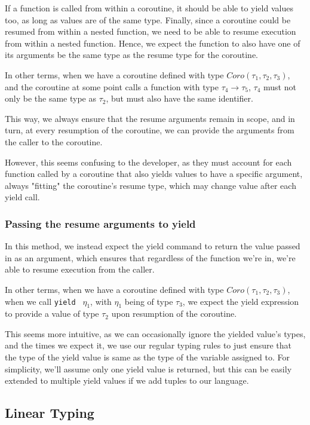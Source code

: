 \documentclass[review,twocolumn]{sigplanconf}
\begin{document}
If a function is called from within a coroutine, it should be able to yield values too, as long as values are of the same type. Finally, since a coroutine could be resumed from within a nested function, we need to be able to resume execution from within a nested function. Hence, we expect the function to also have one of its arguments be the same type as the resume type for the coroutine.

In other terms, when we have a coroutine defined with type $Coro(\tau_1, \tau_2, \tau_3)$, and the coroutine at some point calls a function with type $\tau_4 \rightarrow \tau_5$, $\tau_4$ must not only be the same type as $\tau_2$, but must also have the same identifier.

This way, we always ensure that the resume arguments remain in scope, and in turn, at every resumption of the coroutine, we can provide the arguments from the caller to the coroutine.

However, this seems confusing to the developer, as they must account for each function called by a coroutine that also yields values to have a specific argument, always "fitting" the coroutine's resume type, which may change  value after each yield call.

\subsubsection{Passing the resume arguments to yield}

In this method, we instead expect the yield command to return the value passed in as an argument, which ensures that regardless of the function we're in, we're able to resume execution from the caller.


In other terms, when we have a coroutine defined with type $Coro(\tau_1, \tau_2, \tau_3)$, when we call \verb!yield ! $\eta_1$, with $\eta_1$ being of type $\tau_3$, we expect the yield expression to provide a value of type $\tau_2$ upon resumption of the coroutine.

This seems more intuitive, as we can occasionally ignore the yielded value's types, and the times we expect it, we use our regular typing rules to just ensure that the type of the yield value is same as the type of the variable  assigned to. For simplicity, we'll assume only one yield value is returned, but this can be easily extended to multiple yield values if we add tuples to our language.

\subsection{Linear Typing}
\end{document}

